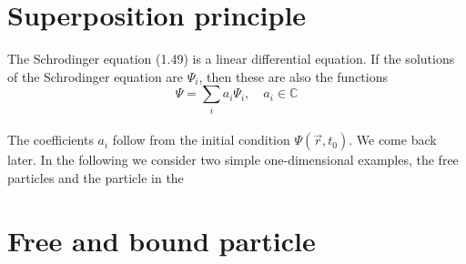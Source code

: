 \section{Superposition principle}
The Schrodinger equation (1.49) is a linear differential equation.
If the solutions of the Schrodinger equation are $\Psi_i$, then these are also the functions
\\
\begin{equation}
\Psi=\sum_{i} a_{i} \Psi_{i}, \quad a_{i} \in \mathbb{C}
\end{equation}\\
The coefficients $a_i$ follow from the initial condition $\Psi(\vec{r}, t_0)$. We come back later. In the following we consider two simple one-dimensional
examples, the free particles and the particle in the \section{Free and bound particle}
